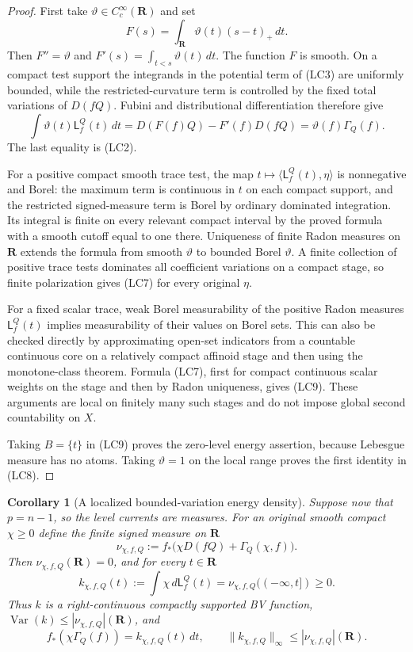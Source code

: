 \documentclass[11pt,a4paper]{article}
\numberwithin{equation}{section}
\newtheorem{corollary}[theorem]{Corollary}
\theoremstyle{definition}
\theoremstyle{remark}
\begin{document}
\begin{proof}
First take $\vartheta\in C_c^\infty(\mathbf R)$ and set
\[
 F(s)=\int_{\mathbf R}\vartheta(t)(s-t)_+\,dt.
\]
Then $F''=\vartheta$ and
$F'(s)=\int_{t<s}\vartheta(t)\,dt$.  The function $F$ is
smooth.  On a compact test support the integrands in the
potential term of (LC3) are uniformly bounded, while the
restricted-curvature term is controlled by the fixed total
variations of $D(fQ)$.  Fubini and distributional differentiation
therefore give
\[
 \int\vartheta(t)\mathsf L^Q_f(t)\,dt
      =D(F(f)Q)-F'(f)D(fQ)
      =\vartheta(f)\Gamma_Q(f).
\]
The last equality is (LC2).

For a positive compact smooth trace test, the map
$t\mapsto\langle\mathsf L^Q_f(t),\eta\rangle$ is
nonnegative and Borel: the maximum term is continuous in $t$
on each compact support, and the restricted signed-measure term
is Borel by ordinary dominated integration.  Its integral is
finite on every relevant compact interval by the proved formula
with a smooth cutoff equal to one there.  Uniqueness of finite
Radon measures on $\mathbf R$ extends the formula from smooth
$\vartheta$ to bounded Borel $\vartheta$.  A finite collection
of positive trace tests dominates all coefficient variations
on a compact stage, so finite polarization gives (LC7) for
every original $\eta$.

For a fixed scalar trace, weak Borel measurability of the positive
Radon measures $\mathsf L^Q_f(t)$ implies measurability of their
values on Borel sets.  This can also be checked directly by
approximating open-set indicators from a countable continuous
core on a relatively compact affinoid stage and then using the
monotone-class theorem.  Formula (LC7), first for compact
continuous scalar weights on the stage and then by Radon
uniqueness, gives (LC9).  These arguments are local on finitely
many such stages and do not impose global second countability
on $X$.

Taking $B=\{t\}$ in (LC9) proves the zero-level energy assertion,
because Lebesgue measure has no atoms.  Taking $\vartheta=1$
on the local range proves the first identity in (LC8).
\end{proof}

\begin{corollary}[A localized bounded-variation energy density]
\label{cor:r11-energy-bv-density}
Suppose now that $p=n-1$, so the level currents are measures.
For an original smooth compact $\chi\ge0$ define the finite
signed measure on $\mathbf R$
\[
 \nu_{\chi,f,Q}
  :=f_*\bigl(\chi D(fQ)+\Gamma_Q(\chi,f)\bigr).
 \tag{LC10}
\]
Then $\nu_{\chi,f,Q}(\mathbf R)=0$, and for every $t\in\mathbf R$
\[
 k_{\chi,f,Q}(t):=\int\chi\,d\mathsf L^Q_f(t)
       =\nu_{\chi,f,Q}(( -\infty,t])\ge0.
 \tag{LC11}
\]
Thus $k$ is a right-continuous compactly supported BV function,
$\operatorname{Var}(k)\le|\nu_{\chi,f,Q}|(\mathbf R)$, and
\[
 f_*(\chi\Gamma_Q(f))=k_{\chi,f,Q}(t)\,dt,
 \qquad
 \|k_{\chi,f,Q}\|_\infty
                     \le|\nu_{\chi,f,Q}|(\mathbf R).
 \tag{LC12}
\]
\end{corollary}
\end{document}
